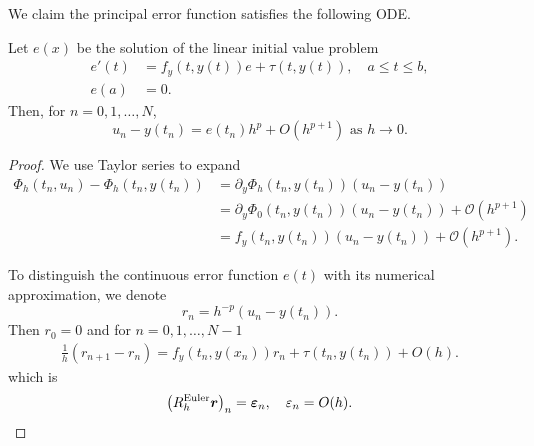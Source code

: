 \documentclass[10pt]{amsart}
\begin{document}
We claim the principal error function satisfies the following ODE.
\begin{theorem}
Let $e(x)$ be the solution of the linear initial value problem
$$
\begin{aligned}
e'(t)& =f_y(t, {y}(t)) e+{\tau}(t, {y}(t)), \quad a \leq t \leq b, \\
e(a) & = 0.
\end{aligned}
$$
Then, for $n=0,1, \ldots, N$,
$$
{u}_n-{y}\left(t_n\right)=e\left(t_n\right) h^p+O\left(h^{p+1}\right) \text { as } h \rightarrow 0.
$$
\end{theorem}
\begin{proof}
We use Taylor series to expand
$$
\begin{aligned}
\Phi_h(t_n, u_n) - \Phi_h(t_n, y(t_n)) &= \partial_y\Phi_h(t_n, y(t_n))( u_n - y(t_n))\\
&= \partial_y\Phi_0(t_n, y(t_n))( u_n - y(t_n)) + \mathcal O(h^{p+1})\\
&= f_y(t_n, y(t_n))( u_n - y(t_n)) + \mathcal O(h^{p+1}).
\end{aligned}
$$

To distinguish the continuous error function $e(t)$ with its numerical approximation, we denote
$$
r_n = h^{-p} ({u}_n-{y}\left(t_n\right)). 
$$
Then $r_0 = 0$ and for $n=0,1, \ldots, N-1$
$$
\begin{gathered}
\frac{1}{h}\left(r_{n+1}-r_n\right)=f_y\left(t_n, {y}\left(x_n\right)\right) r_n+{\tau}\left(t_n, {y}\left(t_n\right)\right)+O(h).
\end{gathered}
$$
which is
$$
\left(R_h^{\text {Euler}} \boldsymbol r\right)_n=\boldsymbol{\varepsilon}_n, \quad  \varepsilon_n=O(h).
$$
\end{proof}
\end{document}
